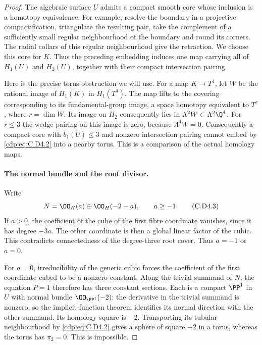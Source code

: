 \begin{proof}
The algebraic surface $U$ admits a compact smooth core whose
inclusion is a homotopy equivalence. For example, resolve the
boundary in a projective compactification, triangulate the
resulting pair, take the complement of a sufficiently small
regular neighbourhood of the boundary and round its corners.
The radial collars of this regular neighbourhood give the
retraction. We choose this core for $K$. Thus the preceding
embedding induces one map carrying all of $H_1(U)$ and
$H_2(U)$, together with their compact intersection pairing.

Here is the precise torus obstruction we will use. For a map
$K\to T^4$, let $W$ be the rational image of $H_1(K)$ in
$H_1(T^4)$. The map lifts to the covering corresponding to
its fundamental-group image, a space homotopy equivalent to
$T^r$, where $r=\dim W$. Its image on $H_2$ consequently lies
in $\Lambda^2W\subset\Lambda^2\Q^4$. For $r\le3$ the wedge
pairing on this image is zero, because $\Lambda^4W=0$.
Consequently a compact core with $b_1(U)\le3$ and nonzero
intersection pairing cannot embed by \eqref{cdp:eq:C.D4.2} into a nearby
torus. This is a comparison of the actual homology maps.

\paragraph{The normal bundle and the root divisor.}
Write
\[
                  N=\OO_H(a)\oplus\OO_H(-2-a),\qquad a\ge-1.
\tag{C.D4.3}\label{cdp:eq:C.D4.3}
\]
If $a>0$, the coefficient of the cube of the first fibre
coordinate vanishes, since it has degree $-3a$. The other
coordinate is then a global linear factor of the cubic.
This contradicts connectedness of the degree-three root
cover. Thus $a=-1$ or $a=0$.

For $a=0$, irreducibility of the generic cubic forces the
coefficient of the first coordinate cubed to be a nonzero
constant. Along the trivial summand of $N$, the equation
$P=1$ therefore has three constant sections. Each is a
compact $\PP^1$ in $U$ with normal bundle $\OO_{\PP^1}(-2)$:
the derivative in the trivial summand is nonzero, so the
implicit-function theorem identifies its normal direction
with the other summand. Its homology square is $-2$.
Transporting its tubular neighbourhood by \eqref{cdp:eq:C.D4.2} gives a
sphere of square $-2$ in a torus, whereas the torus has
$\pi_2=0$. This is impossible.


\end{proof}
